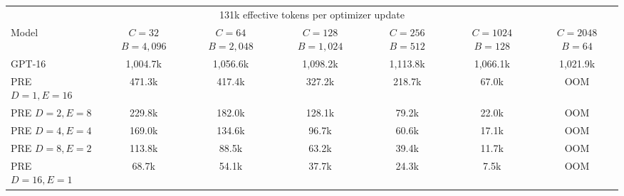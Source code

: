 \documentclass[10pt]{article}
\begin{document}
\setcounter{table}{10}
\begin{center}
\scriptsize
\setlength{\tabcolsep}{3.2pt}
\begin{tabular}{lcccccc}
  \toprule
  \multicolumn{7}{c}{131k effective tokens per optimizer update} \\
  \cmidrule(lr){1-7}
  Model & \shortstack{\(C=32\)\\\(B=4{,}096\)} & \shortstack{\(C=64\)\\\(B=2{,}048\)} & \shortstack{\(C=128\)\\\(B=1{,}024\)} & \shortstack{\(C=256\)\\\(B=512\)} & \shortstack{\(C=1024\)\\\(B=128\)} & \shortstack{\(C=2048\)\\\(B=64\)} \\
  \midrule
  GPT-16 & 1{,}004.7k & 1{,}056.6k & 1{,}098.2k & 1{,}113.8k & 1{,}066.1k & 1{,}021.9k \\
  PRE \(D=1,E=16\) & 471.3k & 417.4k & 327.2k & 218.7k & 67.0k & OOM \\
  PRE \(D=2,E=8\) & 229.8k & 182.0k & 128.1k & 79.2k & 22.0k & OOM \\
  PRE \(D=4,E=4\) & 169.0k & 134.6k & 96.7k & 60.6k & 17.1k & OOM \\
  PRE \(D=8,E=2\) & 113.8k & 88.5k & 63.2k & 39.4k & 11.7k & OOM \\
  PRE \(D=16,E=1\) & 68.7k & 54.1k & 37.7k & 24.3k & 7.5k & OOM \\
  \bottomrule
\end{tabular}

\vspace{0.7em}


\end{center}
\end{document}

